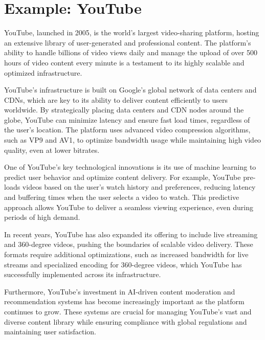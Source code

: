 \section{Example: YouTube}
YouTube, launched in 2005, is the world's largest video-sharing platform, hosting an extensive library of user-generated and professional content. The platform's ability to handle billions of video views daily and manage the upload of over 500 hours of video content every minute is a testament to its highly scalable and optimized infrastructure\cite{youtube_infrastructure}.

YouTube's infrastructure is built on Google's global network of data centers and CDNs, which are key to its ability to deliver content efficiently to users worldwide. By strategically placing data centers and CDN nodes around the globe, YouTube can minimize latency and ensure fast load times, regardless of the user's location\cite{google_cloud}. The platform uses advanced video compression algorithms, such as VP9 and AV1, to optimize bandwidth usage while maintaining high video quality, even at lower bitrates\cite{youtube_compression}.

One of YouTube's key technological innovations is its use of machine learning to predict user behavior and optimize content delivery. For example, YouTube pre-loads videos based on the user's watch history and preferences, reducing latency and buffering times when the user selects a video to watch\cite{youtube_ml}. This predictive approach allows YouTube to deliver a seamless viewing experience, even during periods of high demand.

In recent years, YouTube has also expanded its offering to include live streaming and 360-degree videos, pushing the boundaries of scalable video delivery. These formats require additional optimizations, such as increased bandwidth for live streams and specialized encoding for 360-degree videos, which YouTube has successfully implemented across its infrastructure\cite{youtube_live}.

Furthermore, YouTube's investment in AI-driven content moderation and recommendation systems has become increasingly important as the platform continues to grow. These systems are crucial for managing YouTube's vast and diverse content library while ensuring compliance with global regulations and maintaining user satisfaction\cite{youtube_ai}.

